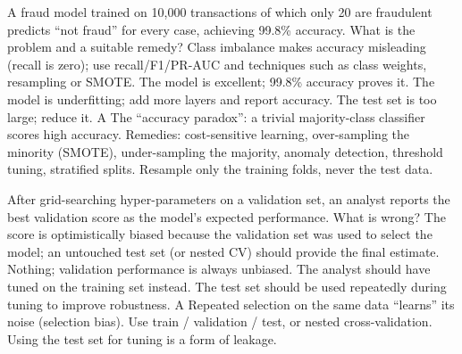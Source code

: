{A fraud model trained on 10{,}000 transactions of which only 20 are fraudulent predicts ``not fraud'' for every case, achieving 99.8\% accuracy. What is the problem and a suitable remedy?}
{Class imbalance makes accuracy misleading (recall is zero); use recall/F1/PR-AUC and techniques such as class weights, resampling or SMOTE.}
{The model is excellent; 99.8\% accuracy proves it.}
{The model is underfitting; add more layers and report accuracy.}
{The test set is too large; reduce it.}
{A}
{The ``accuracy paradox'': a trivial majority-class classifier scores high accuracy. Remedies: cost-sensitive learning, over-sampling the minority (SMOTE), under-sampling the majority, anomaly detection, threshold tuning, stratified splits. Resample only the training folds, never the test data.}

{After grid-searching hyper-parameters on a validation set, an analyst reports the best validation score as the model's expected performance. What is wrong?}
{The score is optimistically biased because the validation set was used to select the model; an untouched test set (or nested CV) should provide the final estimate.}
{Nothing; validation performance is always unbiased.}
{The analyst should have tuned on the training set instead.}
{The test set should be used repeatedly during tuning to improve robustness.}
{A}
{Repeated selection on the same data ``learns'' its noise (selection bias). Use train / validation / test, or nested cross-validation. Using the test set for tuning is a form of leakage.}

